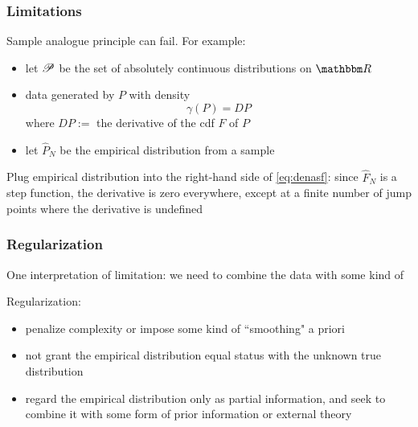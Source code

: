 \begin{frame}\frametitle{Limitations} 

    \vspace{1em}
    Sample analogue principle can fail. For example:
    
    \begin{itemize}
        \item let $\mathscr P$ be the set of absolutely continuous distributions on $\RR$
        \item data generated by $P$ with 
        density
        \begin{equation}
            \label{eq:denasf}
            \gamma(P) = DP
        \end{equation}
        where $DP :=$ the derivative of the {\sc cdf} $F$ of $P$
        
        \item let $\hat P_N$ be the empirical distribution from a sample
    \end{itemize}
    
    Plug empirical distribution into the right-hand side
    of \eqref{eq:denasf}: since $\hat F_N$ is a step function,
    the derivative is zero everywhere, except at a finite number
    of jump points where the derivative is undefined 
        
\end{frame}

\begin{frame}\frametitle{Regularization}

    \vspace{2em}
    One interpretation of limitation: we need to combine the data with
    some kind of 
    
    \vspace{.7em}
    Regularization:
    \begin{itemize}
        \item  penalize
            complexity or impose some kind of ``smoothing" a
            priori
        \item not
    grant the empirical distribution equal status with the unknown true
    distribution
        \item  regard the empirical distribution 
    only as partial information, and seek to 
    combine it with some form of prior information or external theory
    
    \end{itemize}
  
\end{frame}

